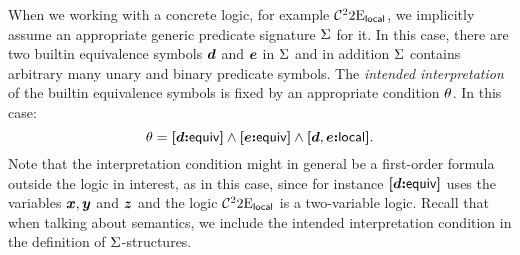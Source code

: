 When we working with a concrete logic, for example
$\mathcal{C}^{2}_{{}}{2}\mathrm{E}_{\mathsf{local}}$,
we implicitly assume an appropriate generic predicate signature $\mathrm{\Sigma}$ for it.
In this case, there are two builtin equivalence symbols $\bm{d}$ and $\bm{e}$ in
$\mathrm{\Sigma}$ and in addition $\mathrm{\Sigma}$ contains arbitrary many unary
and binary predicate symbols.
The \emph{intended interpretation} of the builtin equivalence symbols is fixed
by an appropriate condition $\theta$.
In this case:
\[
  \theta = {\bm{[}\bm{d}\mathord{\bm{:}}\mathsf{equiv}\bm{]}} \land {\bm{[}\bm{e}\mathord{\bm{:}}\mathsf{equiv}\bm{]}} \land {\bm{[}\bm{d},\bm{e}\mathord{\bm{:}}\mathsf{local}\bm{]}}.
\] 
Note that the interpretation condition might in general be a first-order formula
outside the logic in interest, as in this case, since for instance ${\bm{[}\bm{d}\mathord{\bm{:}}\mathsf{equiv}\bm{]}}$
uses the variables $\bm{x},\bm{y}$ and $\bm{z}$ and the logic
$\mathcal{C}^{2}_{{}}{2}\mathrm{E}_{\mathsf{local}}$ is a two-variable logic.
Recall that when talking about semantics, we include the intended interpretation
condition in the definition of $\mathrm{\Sigma}$-structures.